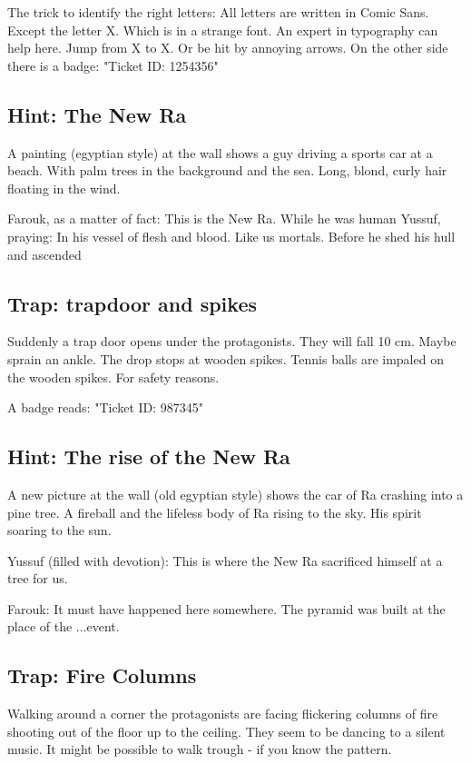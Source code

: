 The trick to identify the right letters: All letters are written in Comic Sans. Except the letter X. Which is in a strange font. An expert in typography can help here. Jump from X to X. Or be hit by annoying arrows. On the other side there is a badge: "Ticket ID: 1254356"

\subsection{Hint: The New Ra}

A painting (egyptian style) at the wall shows a guy driving a sports car at a beach. With palm trees in the background and the sea. Long, blond, curly hair floating in the wind.

Farouk, as a matter of fact: This is the New Ra. While he was human
Yussuf, praying: In his vessel of flesh and blood. Like us mortals. Before he shed his hull and ascended

\subsection{Trap: trapdoor and spikes}

Suddenly a trap door opens under the protagonists. They will fall 10 cm. Maybe sprain an ankle. The drop stops at wooden spikes. Tennis balls are impaled on the wooden spikes. For safety reasons.

A badge reads: "Ticket ID: 987345"

\subsection{Hint: The rise of the New Ra}

A new picture at the wall (old egyptian style) shows the car of Ra crashing into a pine tree. A fireball and the lifeless body of Ra rising to the sky. His spirit soaring to the sun.

Yussuf (filled with devotion): This is where the New Ra sacrificed himself at a tree for us.

Farouk: It must have happened here somewhere. The pyramid was built at the place of the ...event.


\subsection{Trap: Fire Columns}

Walking around a corner the protagonists are facing flickering columns of fire shooting out of the floor up to the ceiling. They seem to be dancing to a silent music.
It might be possible to walk trough - if you know the pattern.

